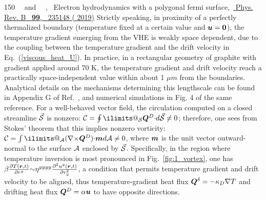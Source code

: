 \documentclass[
prb,
twocolumn,
superscriptaddress,
 amsmath,amssymb,
 aps,
longbibliography,
]{revtex4-2}
\begin{document}
\begin{thebibliography}{150}
  \BibitemOpen
   { {\ }\ and\  {~},\ } { {Electron hydrodynamics with a polygonal fermi surface},\ }\href {https://doi.org/10.1103/PhysRevB.99.235148} { { {Phys. Rev. B}\ }\textbf { {99}},\  {235148} ( {2019})}
  \BibitemOpen
   {Strictly speaking, in proximity of a perfectly thermalized boundary (temperature fixed at a certain value and $\protect \bm {u}=\protect \bm {0}$), the temperature gradient emerging from the VHE is weakly space dependent, due to the coupling between the temperature gradient and the drift velocity in Eq.~(\ref {viscous_heat_U}). In practice, in a rectangular geometry of graphite with gradient applied around 70 K, the temperature gradient and drift velocity reach a practically space-independent value within about 1 $\mu m$ from the boundaries. Analytical details on the mechanisms determining this lengthscale can be found in Appendix G of Ref.~\cite {Simoncelli2020}, and numerical simulations in Fig. 4 of the same reference.}
  \BibitemOpen
   {For a well-behaved vector field, the circulation computed on a closed streamline $\protect \vec {\protect \mathcal {S}}$ is nonzero: $\protect \mathcal {C}=\DOTSI \ointop \ilimits@ _{\protect \mathcal {S}}\protect \bm {Q}^D{\cdot } d\protect \vec {\protect \mathcal {S}}\protect \neq 0$; therefore, one sees from Stokes' theorem that this implies nonzero vorticity: $\protect \mathcal {C}=\DOTSI \intop \ilimits@ _{\protect \mathcal {A}}(\nabla {\times } \protect \bm {Q}^D){\cdot }\protect \bm {m} d{\protect \mathcal {A}}\protect \neq 0$, where $\protect \bm {m}$ is the unit vector outward-normal to the surface $\protect \mathcal {A}$ enclosed by $\protect \vec {\protect \mathcal {S}}$.}
  \BibitemOpen
   {Specifically, in the region where temperature inversion is most pronounced in Fig.~\ref {fig:1_vortex}, one has $\beta \protect \frac {\partial T({\protect \bm {r}}, t)}{\partial r^y} {\sim } \eta ^{yyyy} \protect \frac {\partial ^2 u^y({\protect \bm {r}}, t)}{\partial r_y^2}$, a condition that permits temperature gradient and drift velocity to be aligned, thus temperature-gradient heat flux $\protect \bm {Q}^\delta =-\kappa _D\nabla T$ and drifting heat flux $\protect \bm {Q}^D=\alpha \protect \bm {u}$ to have opposite directions.}

\end{thebibliography}
\end{document}
